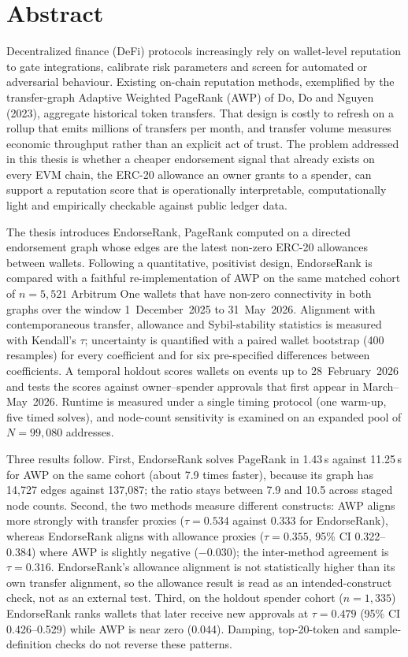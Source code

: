 
\chapter*{Abstract}

\label{ch:abstract}

Decentralized finance (DeFi) protocols increasingly rely on wallet-level reputation to gate integrations, calibrate risk parameters and screen for automated or adversarial behaviour. Existing on-chain reputation methods, exemplified by the transfer-graph Adaptive Weighted PageRank (AWP) of Do, Do and Nguyen (2023), aggregate historical token transfers. That design is costly to refresh on a rollup that emits millions of transfers per month, and transfer volume measures economic throughput rather than an explicit act of trust. The problem addressed in this thesis is whether a cheaper endorsement signal that already exists on every EVM chain, the ERC-20 allowance an owner grants to a spender, can support a reputation score that is operationally interpretable, computationally light and empirically checkable against public ledger data.

The thesis introduces EndorseRank, PageRank computed on a directed endorsement graph whose edges are the latest non-zero ERC-20 allowances between wallets. Following a quantitative, positivist design, EndorseRank is compared with a faithful re-implementation of AWP on the same matched cohort of $n=5{,}521$ Arbitrum One wallets that have non-zero connectivity in both graphs over the window 1~December~2025 to 31~May~2026. Alignment with contemporaneous transfer, allowance and Sybil-stability statistics is measured with Kendall's $\tau$; uncertainty is quantified with a paired wallet bootstrap (400 resamples) for every coefficient and for six pre-specified differences between coefficients. A temporal holdout scores wallets on events up to 28~February~2026 and tests the scores against owner--spender approvals that first appear in March--May~2026. Runtime is measured under a single timing protocol (one warm-up, five timed solves), and node-count sensitivity is examined on an expanded pool of $N=99{,}080$ addresses.

Three results follow. First, EndorseRank solves PageRank in 1.43\,s against 11.25\,s for AWP on the same cohort (about 7.9 times faster), because its graph has 14,727 edges against 137,087; the ratio stays between 7.9 and 10.5 across staged node counts. Second, the two methods measure different constructs: AWP aligns more strongly with transfer proxies ($\tau=0.534$ against 0.333 for EndorseRank), whereas EndorseRank aligns with allowance proxies ($\tau=0.355$, 95\% CI 0.322--0.384) where AWP is slightly negative ($-0.030$); the inter-method agreement is $\tau=0.316$. EndorseRank's allowance alignment is not statistically higher than its own transfer alignment, so the allowance result is read as an intended-construct check, not as an external test. Third, on the holdout spender cohort ($n=1{,}335$) EndorseRank ranks wallets that later receive new approvals at $\tau=0.479$ (95\% CI 0.426--0.529) while AWP is near zero (0.044). Damping, top-20-token and sample-definition checks do not reverse these patterns.

